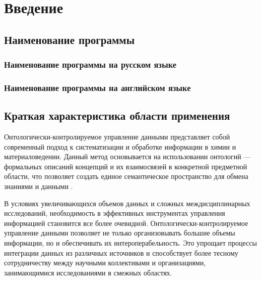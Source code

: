 \documentclass[a4paper,12pt,reqno]{article}
\begin{document}
    \project{\unskip}

    \firstPage
    \newpage

    \secondPage
    \newpage

    \thirdPage
    \newpage


    \section{Введение}

    \subsection{Наименование программы}

    \subsubsection{Наименование программы на русском языке}
    \unskip

    \subsubsection{Наименование программы на английском языке}
    \unskip

    \subsection{Краткая характеристика области применения}
    Онтологически-контролируемое управление данными представляет собой современный подход к систематизации и обработке информации в химии и материаловедении. Данный метод основывается на использовании онтологий — формальных описаний концепций и их взаимосвязей в конкретной предметной области, что позволяет создать единое семантическое пространство для обмена знаниями и данными \cite{ontology:base}.

    В условиях увеличивающихся объемов данных и сложных междисциплинарных исследований, необходимость в эффективных инструментах управления информацией становится все более очевидной. Онтологически-контролируемое управление данными позволяет не только организовывать большие объемы информации, но и обеспечивать их интероперабельность. Это упрощает процессы интеграции данных из различных источников и способствует более тесному сотрудничеству между научными коллективами и организациями, занимающимися исследованиями в смежных областях.
    \newpage
\end{document}
